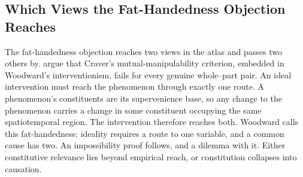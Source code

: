 %
%


\subsection{Which Views the Fat-Handedness Objection Reaches}

The fat-handedness objection reaches two views in the atlas and passes two
others by.  \citet{baumgartner2016} argue that Craver's mutual-manipulability
criterion, embedded in Woodward's interventionism, fails for every genuine
whole--part pair.  An ideal intervention must reach the phenomenon through
exactly one route.  A phenomenon's constituents are its supervenience base, so
any change to the phenomenon carries a change in some constituent occupying the
same spatiotemporal region.  The intervention therefore reaches both.  Woodward
calls this fat-handedness: ideality requires a route to one variable, and a
common cause has two.  An impossibility proof follows, and a dilemma with it.
Either constitutive relevance lies beyond empirical reach, or constitution
collapses into causation.

